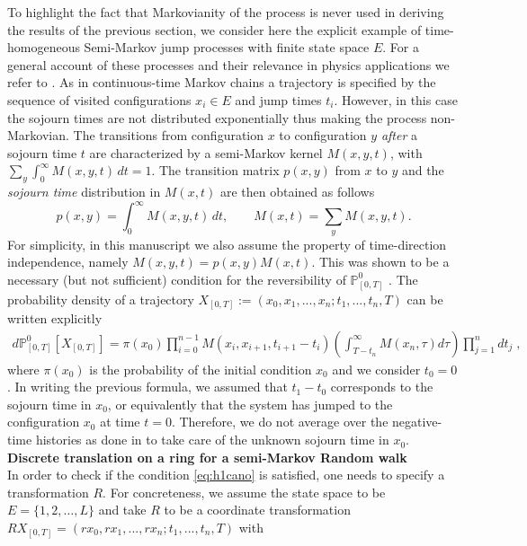 \documentclass[a4paper,11pt]{article}
\numberwithin{equation}{section}
\begin{document}
\noindent
To highlight the fact that Markovianity of the process is never used in deriving the results of the previous section, we consider here the explicit example of time-homogeneous Semi-Markov jump processes with finite state space $E$. For a general account of these processes and their relevance in physics applications we refer to \cite{AG08,MNW09}. As in continuous-time Markov chains a trajectory is specified by the sequence of visited configurations $x_i \in E$ and jump times $t_i$. However, in this case the sojourn times are not distributed exponentially thus making the process non-Markovian. The transitions from configuration $x$ to configuration $y$ \emph{after} a sojourn time $t$ are characterized by a semi-Markov kernel $M(x,y,t)$, with $\sum_y\int_0^\infty M(x,y,t)\, dt=1$. The transition matrix $p(x,y)$ from $x$ to $y$ and the \emph{sojourn time} distribution in $M(x,t)$ are then obtained as follows
\begin{equation*}
    p(x,y)= \int_0^\infty M(x,y,t)\, dt ,  \qquad M(x,t) = \sum_y M(x,y,t).
\end{equation*}
For simplicity, in this manuscript we also assume the property of time-direction independence, namely $M(x,y,t)=p(x,y)M(x,t)$. This was shown to be a necessary (but not sufficient) condition for the reversibility of $\mathbb{P}_{[0,T]}^0$ \cite{QW06}.
The probability density of a trajectory $X_{[0,T]}:= (x_0,x_1,...,x_n;t_1,...,t_n,T)$ can be written explicitly
\begin{align}\label{eq:ptraj}
    d \mathbb{P}_{[0,T]}^0 [X_{[0,T]}] = \pi(x_0) \prod_{i=0}^{n-1} M(x_i,x_{i+1},t_{i+1}-t_i) \left(\int_{T-t_n}^{\infty} M(x_n,\tau) d\tau \right) \prod_{j=1}^{n} dt_j \;,
\end{align}
where $\pi(x_0)$ is the probability of the initial condition $x_0$ and we consider $t_0=0$. In writing the previous formula, we assumed that $t_1-t_0$ corresponds to the sojourn time in $x_0$, or equivalently that the system has jumped to the configuration $x_0$ at time $t=0$. Therefore, we do not average over the negative-time histories as done in \cite{MNW09} to take care of the unknown sojourn time in $x_0$. \\
\textbf{Discrete translation on a ring for a semi-Markov Random walk} \\
\noindent
In order to check if the condition \eqref{eq:h1cano} is satisfied, one needs to specify a transformation $R$. For concreteness, we assume the state space to be $E= \{ 1,2, \ldots, L \}$ and take $R$ to be a coordinate transformation $R X_{[0,T]}= (r x_0,r x_1,...,r x_n;t_1,...,t_n,T)$ with
\end{document}
